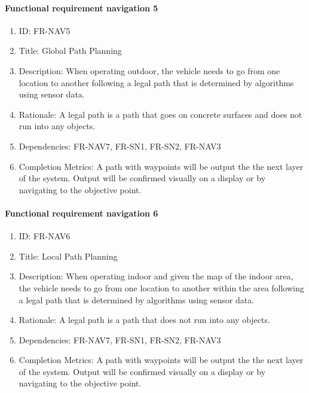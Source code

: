 \documentclass[compsoc,draftclsnofoot,onecolumn,10pt]{IEEEtran}
\begin{document}
	\paragraph{Functional requirement navigation 5}
		\begin{enumerate}
			\item ID: FR-NAV5
			\item Title: Global Path Planning
			\item Description: When operating outdoor, the vehicle needs to go from one location to another following a legal path that is determined by algorithms using sensor data.
			\item Rationale: A legal path is a path that goes on concrete surfaces and does not run into any objects.
			\item Dependencies: FR-NAV7, FR-SN1, FR-SN2, FR-NAV3
			\item Completion Metrics: A path with waypoints will be output the the next layer of the system. 
			Output will be confirmed visually on a display or by navigating to the objective point.  
		\end{enumerate}

	\paragraph{Functional requirement navigation 6}
		\begin{enumerate}
			\item ID: FR-NAV6
			\item Title: Local Path Planning
			\item Description: When operating indoor and given the map of the indoor area, the vehicle needs to go from one location to another within the area following a legal path that is determined by algorithms using sensor data.
			\item Rationale: A legal path is a path that does not run into any objects.
			\item Dependencies: FR-NAV7, FR-SN1, FR-SN2, FR-NAV3
			\item Completion Metrics: A path with waypoints will be output the the next layer of the system. 
			Output will be confirmed visually on a display or by navigating to the objective point.  
		\end{enumerate}
\end{document}
